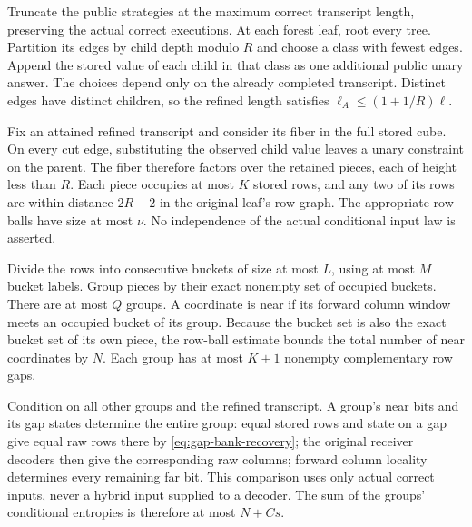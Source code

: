 \begin{proofoutline}
Truncate the public strategies at the maximum correct transcript length,
preserving the actual correct executions. At each forest leaf, root every
tree. Partition its edges by child depth modulo $R$ and choose a class with
fewest edges. Append the stored value of each child in that class as one
additional public unary answer. The choices depend only on the already
completed transcript. Distinct edges have distinct children, so the refined
length satisfies $\ell_A\le(1+1/R)\ell$.

Fix an attained refined transcript and consider its fiber in the full stored
cube. On every cut edge, substituting the observed child value leaves a unary
constraint on the parent. The fiber therefore factors over the retained
pieces, each of height less than $R$. Each piece occupies at most $K$ stored
rows, and any two of its rows are within distance $2R-2$ in the original
leaf's row graph. The appropriate row balls have size at most $\nu$.
No independence of the actual conditional input law is asserted.

Divide the rows into consecutive buckets of size at most $L$, using at most
$M$ bucket labels. Group pieces by their exact nonempty set of occupied
buckets. There are at most $Q$ groups. A coordinate is near if its forward
column window meets an occupied bucket of its group. Because the bucket set
is also the exact bucket set of its own piece, the row-ball estimate bounds
the total number of near coordinates by $N$. Each group has at most $K+1$
nonempty complementary row gaps.

Condition on all other groups and the refined transcript. A group's near
bits and its gap states determine the entire group: equal stored rows and
state on a gap give equal raw rows there by \eqref{eq:gap-bank-recovery};
the original receiver decoders then give the corresponding raw columns;
forward column locality determines every remaining far bit. This comparison
uses only actual correct inputs, never a hybrid input supplied to a decoder.
The sum of the groups' conditional entropies is therefore at most $N+Cs$.


\end{proofoutline}

